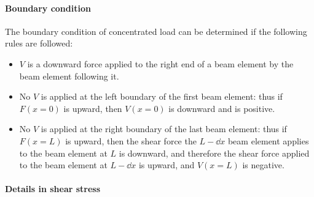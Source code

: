 \documentclass[hyperref, a4paper]{article}
\begin{document}
\paragraph*{Boundary condition} The boundary condition of concentrated load can be determined
if the following rules are followed: 
\begin{itemize}
    \item $V$ is a downward force applied to the right end of a beam element 
    by the beam element following it. 
    \item No $V$ is applied at the left boundary of the first beam element: 
    thus if $F(x = 0)$ is upward, 
    then $V(x = 0)$ is downward and is positive.
    \item No $V$ is applied at the right boundary of the last beam element:
    thus if $F(x = L)$ is upward, 
    then the shear force the $L - \dd{x}$ beam element applies to the beam element at $L$ 
    is downward, and therefore the shear force 
    applied to the beam element at $L - \dd{x}$ is upward, 
    and $V(x = L)$ is negative.
\end{itemize}

\paragraph*{Details in shear stress}
\end{document}
